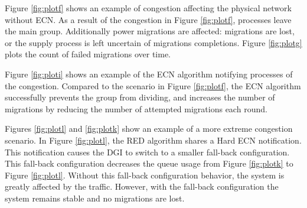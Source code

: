Figure \ref{fig:plotf} shows an example of congestion affecting the physical network without \ac{ECN}.
As a result of the congestion in Figure \ref{fig:plotf}, processes leave the main group.
Additionally power migrations are affected: migrations are lost, or the supply process is left uncertain of migrations completions.
Figure \ref{fig:plotg} plots the count of failed migrations over time.

Figure \ref{fig:ploti} shows an example of the \ac{ECN} algorithm notifying processes of the congestion.
Compared to the scenario in Figure \ref{fig:plotf}, the \ac{ECN} algorithm successfully prevents the group from dividing, and increases the number of migrations by reducing the number of attempted migrations each round.

Figures \ref{fig:plotl} and \ref{fig:plotk} show an example of a more extreme congestion scenario.
In Figure \ref{fig:plotl}, the \ac{RED} algorithm shares a Hard \ac{ECN} notification.
This notification causes the \ac{DGI} to switch to a smaller fall-back configuration.
This fall-back configuration decreases the queue usage from Figure \ref{fig:plotk} to Figure \ref{fig:plotl}.
Without this fall-back configuration behavior, the system is greatly affected by the traffic.
However, with the fall-back configuration the system remains stable and no migrations are lost.

